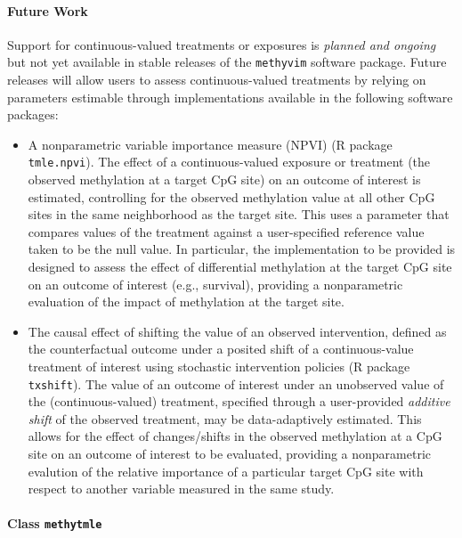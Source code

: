\documentclass[9pt,a4paper,]{extarticle}
\theoremstyle{definition}
\theoremstyle{definition}
\theoremstyle{definition}
\theoremstyle{remark}
\begin{document}
\hypertarget{future-work}{%
\paragraph{Future Work}\label{future-work}}

Support for continuous-valued treatments or exposures is \emph{planned and ongoing}
but not yet available in stable releases of the \texttt{methyvim} software package.
Future releases will allow users to assess continuous-valued treatments by
relying on parameters estimable through implementations available in the
following software packages:

\begin{itemize}
\item
  A nonparametric variable importance measure (NPVI) \citep{chambaz2012estimation}
  (R package \texttt{tmle.npvi}). The effect of a continuous-valued exposure or
  treatment (the observed methylation at a target CpG site) on an outcome of
  interest is estimated, controlling for the observed methylation value at all
  other CpG sites in the same neighborhood as the target site. This uses a
  parameter that compares values of the treatment against a user-specified
  reference value taken to be the null value. In particular, the implementation
  to be provided is designed to assess the effect of differential methylation at
  the target CpG site on an outcome of interest (e.g., survival), providing a
  nonparametric evaluation of the impact of methylation at the target site.
\item
  The causal effect of shifting the value of an observed intervention, defined
  as the counterfactual outcome under a posited shift of a continuous-value
  treatment of interest using stochastic intervention policies
  \citep[\citet{diaz2018stochastic}, \citet{hejazi2018txshift}]{munoz2012population} (R package
  \texttt{txshift}). The value of an outcome of interest under an unobserved value of
  the (continuous-valued) treatment, specified through a user-provided
  \emph{additive shift} of the observed treatment, may be data-adaptively estimated.
  This allows for the effect of changes/shifts in the observed methylation at a
  CpG site on an outcome of interest to be evaluated, providing a nonparametric
  evalution of the relative importance of a particular target CpG site with
  respect to another variable measured in the same study.
\end{itemize}

\hypertarget{class-methytmle}{%
\paragraph{\texorpdfstring{Class \texttt{methytmle}}{Class methytmle}}\label{class-methytmle}}
\end{document}

